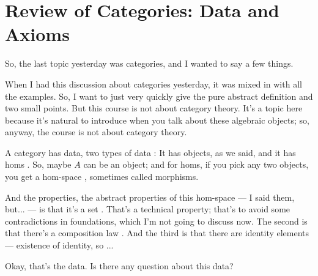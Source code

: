 \section{Review of Categories: Data and Axioms}

\begin{speech}[00:01:26 - 00:02:53]
So, the last topic yesterday was categories, and I wanted to say a few things.

When I had this discussion about categories yesterday, it was mixed in with all the examples. So, I want to just very quickly give the pure abstract definition and two small points. But this course is not about category theory. It's a topic here because it's natural to introduce when you talk about these algebraic objects; so, anyway, the course is not about category theory.

A category has data, two types of data : It has objects, as we said, and it has homs . So, maybe $A$ can be an object; and for homs, if you pick any two objects, you get a hom-space , sometimes called morphisms.

And the properties, the abstract properties of this hom-space --- I said them, but... --- is that it's a set . That's a technical property; that's to avoid some contradictions in foundations, which I'm not going to discuss now. The second is that there's a composition law . And the third is that there are identity elements --- existence of identity, so ...

Okay, that's the data. Is there any question about this data?
\end{speech}

